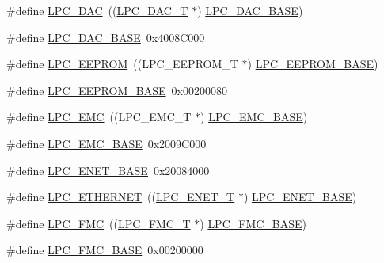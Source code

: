 \begin{DoxyCompactItemize}
\item 
\#define \hyperlink{group__PERIPH__407X__8X__BASE_ga5b94918e9ea326d84ab862a5d377903b}{L\+P\+C\+\_\+\+D\+AC}~((\hyperlink{structLPC__DAC__T}{L\+P\+C\+\_\+\+D\+A\+C\+\_\+T}              $\ast$) \hyperlink{group__PERIPH__407X__8X__BASE_ga3bbaedad584252212d4704bb419489f6}{L\+P\+C\+\_\+\+D\+A\+C\+\_\+\+B\+A\+SE})
\item 
\#define \hyperlink{group__PERIPH__407X__8X__BASE_ga3bbaedad584252212d4704bb419489f6}{L\+P\+C\+\_\+\+D\+A\+C\+\_\+\+B\+A\+SE}~0x4008\+C000
\item 
\#define \hyperlink{group__PERIPH__407X__8X__BASE_ga3af7cc9a426f661ac4deee8a9997a830}{L\+P\+C\+\_\+\+E\+E\+P\+R\+OM}~((L\+P\+C\+\_\+\+E\+E\+P\+R\+O\+M\+\_\+T           $\ast$) \hyperlink{group__PERIPH__407X__8X__BASE_ga9d1fcaafb9feb0f8253c3cef1edc7e9f}{L\+P\+C\+\_\+\+E\+E\+P\+R\+O\+M\+\_\+\+B\+A\+SE})
\item 
\#define \hyperlink{group__PERIPH__407X__8X__BASE_ga9d1fcaafb9feb0f8253c3cef1edc7e9f}{L\+P\+C\+\_\+\+E\+E\+P\+R\+O\+M\+\_\+\+B\+A\+SE}~0x00200080
\item 
\#define \hyperlink{group__PERIPH__407X__8X__BASE_ga115afed5bd08559bbc4eba50e7c23495}{L\+P\+C\+\_\+\+E\+MC}~((L\+P\+C\+\_\+\+E\+M\+C\+\_\+T              $\ast$) \hyperlink{group__PERIPH__407X__8X__BASE_ga52f586bf3c6855ad4ef03b1fee3f2f0d}{L\+P\+C\+\_\+\+E\+M\+C\+\_\+\+B\+A\+SE})
\item 
\#define \hyperlink{group__PERIPH__407X__8X__BASE_ga52f586bf3c6855ad4ef03b1fee3f2f0d}{L\+P\+C\+\_\+\+E\+M\+C\+\_\+\+B\+A\+SE}~0x2009\+C000
\item 
\#define \hyperlink{group__PERIPH__407X__8X__BASE_ga73c18d53000abe3814c4b787cd83a57c}{L\+P\+C\+\_\+\+E\+N\+E\+T\+\_\+\+B\+A\+SE}~0x20084000
\item 
\#define \hyperlink{group__PERIPH__407X__8X__BASE_gaddb977e4442891b21ced3344c71440d7}{L\+P\+C\+\_\+\+E\+T\+H\+E\+R\+N\+ET}~((\hyperlink{structLPC__ENET__T}{L\+P\+C\+\_\+\+E\+N\+E\+T\+\_\+T}             $\ast$) \hyperlink{group__PERIPH__407X__8X__BASE_ga73c18d53000abe3814c4b787cd83a57c}{L\+P\+C\+\_\+\+E\+N\+E\+T\+\_\+\+B\+A\+SE})
\item 
\#define \hyperlink{group__PERIPH__407X__8X__BASE_ga406fa416fe50b196b86146ba0b20ba3c}{L\+P\+C\+\_\+\+F\+MC}~((\hyperlink{structLPC__FMC__T}{L\+P\+C\+\_\+\+F\+M\+C\+\_\+T}              $\ast$) \hyperlink{group__PERIPH__407X__8X__BASE_gaad6b7f57ab13bf5886da624bbb4bcc61}{L\+P\+C\+\_\+\+F\+M\+C\+\_\+\+B\+A\+SE})
\item 
\#define \hyperlink{group__PERIPH__407X__8X__BASE_gaad6b7f57ab13bf5886da624bbb4bcc61}{L\+P\+C\+\_\+\+F\+M\+C\+\_\+\+B\+A\+SE}~0x00200000

\end{DoxyCompactItemize}
